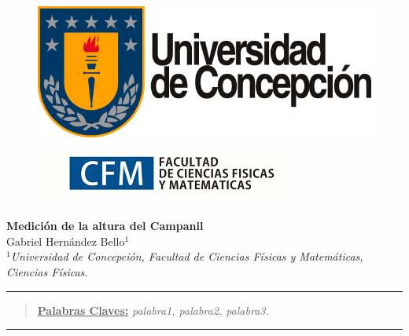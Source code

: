\documentclass[10pt,a4paper]{article}
\author{Gabriel Hernandez Bello}
\begin{document}
	
	\begin{figure}[H]
		\raggedright
		\includegraphics[scale=0.2]{IMG/logo_udec.png} \hfill \includegraphics[scale=0.5]{IMG/cfm_logo.png}
	\end{figure}

	\vspace{6mm}
	\begin{center}
		{\Large \textbf{Medición de la altura del Campanil}}\\
		\vspace{2mm}
		{\large Gabriel Hernández Bello$^{1}$}\\
		\vspace{6.5mm}
		$^1$\textit{Universidad de Concepción, Facultad de Ciencias Físicas y Matemáticas, Ciencias Físicas. }\\
	\end{center}

	\begin{center}
		\textcolor{azul}{\rule{150mm}{0.8mm}}
	\end{center}

	\begin{abstract}
		\underline{\textbf{Palabras Claves:}} \hspace{2mm} \textit{palabra1, palabra2, palabra3.}
	\end{abstract}
	
	\begin{center}
		\textcolor{azul}{\rule{150mm}{0.8mm}}
	\end{center}
	
\end{document}

